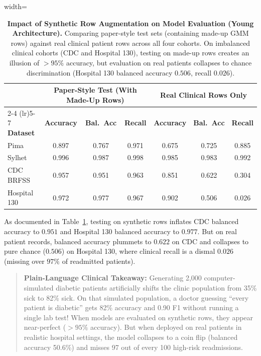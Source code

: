 \documentclass[journal,twocolumn]{IEEEtran}
\begin{document}
\begin{table}[htbp]
\centering\footnotesize
\caption{\textbf{Impact of Synthetic Row Augmentation on Model Evaluation (Young Architecture).} Comparing paper-style test sets (containing made-up GMM rows) against real clinical patient rows across all four cohorts. On imbalanced clinical cohorts (CDC and Hospital 130), testing on made-up rows creates an illusion of $>95\%$ accuracy, but evaluation on real patients collapses to chance discrimination (Hospital 130 balanced accuracy $0.506$, recall $0.026$).}
\label{tab:young_synthetic}
\begin{adjustbox}{width=\columnwidth}
\begin{tabular}{lcccccc}
\toprule 
& \multicolumn{3}{c}{\textbf{Paper-Style Test (With Made-Up Rows)}} & \multicolumn{3}{c}{\textbf{Real Clinical Rows Only}}\\
\cmidrule(lr){2-4} \cmidrule(lr){5-7}
\textbf{Dataset} & \textbf{Accuracy} & \textbf{Bal.\ Acc} & \textbf{Recall} & \textbf{Accuracy} & \textbf{Bal.\ Acc} & \textbf{Recall} \\
\midrule
Pima & 0.897 & 0.767 & 0.971 & 0.675 & 0.725 & 0.885 \\
Sylhet & 0.996 & 0.987 & 0.998 & 0.985 & 0.983 & 0.992 \\
CDC BRFSS & 0.957 & 0.951 & 0.963 & 0.851 & 0.622 & 0.304 \\
Hospital 130 & 0.972 & 0.977 & 0.967 & 0.902 & 0.506 & 0.026 \\
\bottomrule
\end{tabular}
\end{adjustbox}
\end{table}

As documented in Table~\ref{tab:young_synthetic}, testing on synthetic rows inflates CDC balanced accuracy to $0.951$ and Hospital 130 balanced accuracy to $0.977$. But on real patient records, balanced accuracy plummets to $0.622$ on CDC and collapses to pure chance ($0.506$) on Hospital 130, where clinical recall is a dismal $0.026$ (missing over $97\%$ of readmitted patients).

\begin{quote}
\small
\textbf{Plain-Language Clinical Takeaway:} Generating 2,000 computer-simulated diabetic patients artificially shifts the clinic population from 35\% sick to 82\% sick. On that simulated population, a doctor guessing ``every patient is diabetic'' gets 82\% accuracy and 0.90 F1 without running a single lab test! When models are evaluated on synthetic rows, they appear near-perfect ($>95\%$ accuracy). But when deployed on real patients in realistic hospital settings, the model collapses to a coin flip (balanced accuracy 50.6\%) and misses 97 out of every 100 high-risk readmissions.
\end{quote}
\end{document}
